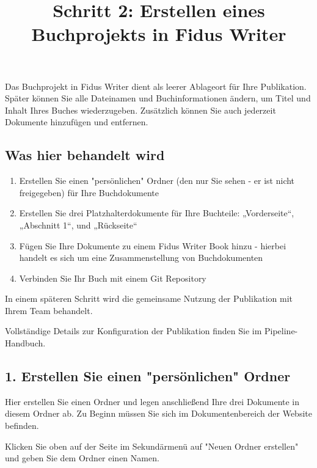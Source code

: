 \documentclass{article}
\begin{document}
\title{Schritt 2: Erstellen eines Buchprojekts in Fidus Writer}

\maketitle


Das Buchprojekt in Fidus Writer dient als leerer Ablageort für Ihre Publikation. Später können Sie alle Dateinamen und Buchinformationen ändern, um Titel und Inhalt Ihres Buches wiederzugeben. Zusätzlich können Sie auch jederzeit Dokumente hinzufügen und entfernen.


\subsection{Was hier behandelt wird}\label{H9231515}


\begin{enumerate}
\item Erstellen Sie einen "persönlichen" Ordner (den nur Sie sehen - er ist nicht freigegeben) für Ihre Buchdokumente


\item Erstellen Sie drei Platzhalterdokumente für Ihre Buchteile: „Vorderseite“, „Abschnitt 1“, und „Rückseite“


\item Fügen Sie Ihre Dokumente zu einem Fidus Writer Book hinzu - hierbei handelt es sich um eine Zusammenstellung von Buchdokumenten


\item Verbinden Sie Ihr Buch mit einem Git Repository


\end{enumerate}

In einem späteren Schritt wird die gemeinsame Nutzung der Publikation mit Ihrem Team behandelt.


Vollständige Details zur Konfiguration der Publikation finden Sie im Pipeline-Handbuch.


\subsection{1. Erstellen Sie einen "persönlichen" Ordner}\label{H4616269}



Hier erstellen Sie einen Ordner und legen anschließend Ihre drei Dokumente in diesem Ordner ab. Zu Beginn müssen Sie sich im Dokumentenbereich der Website befinden.


Klicken Sie oben auf der Seite im Sekundärmenü auf "Neuen Ordner erstellen" und geben Sie dem Ordner einen Namen.
\end{document}
